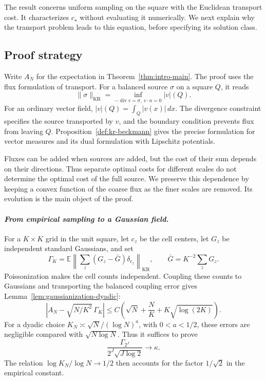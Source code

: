 \documentclass{aomart}
\theoremstyle{definition}
\newcommand{\1}{\mathbf 1}
\newcommand{\KR}{\mathrm{KR}}
\begin{document}
The result concerns uniform sampling on the square with the Euclidean
transport cost.  It characterizes $c_\star$ without evaluating it
numerically.  We next explain why the transport problem leads to this
equation, before specifying its solution class.

\subsection{Proof strategy}\label{subsec:proof-roadmap}

Write $A_N$ for the expectation in Theorem~\ref{thm:intro-main}.
The proof uses the flux formulation of transport.  For a balanced source
$\sigma$ on a square $Q$, it reads
\[
\|\sigma\|_{\KR}
=\inf_{-\operatorname{div}v=\sigma,\ v\cdot n=0}|v|(Q).
\]
For an ordinary vector field, $|v|(Q)=\int_Q|v(x)|\,dx$.
The divergence constraint specifies the source transported by $v$, and
the boundary condition prevents flux from leaving $Q$.
Proposition~\ref{def:kr-beckmann} gives the precise formulation for vector
measures and its dual formulation with Lipschitz potentials.

Fluxes can be added when sources are added, but the cost of their sum
depends on their directions.  Thus separate optimal costs for different
scales do not determine the optimal cost of the full source.  We preserve
this dependence by keeping a convex function of the coarse flux as the
finer scales are removed.  Its evolution is the main object of the proof.

\smallskip
\paragraph{\textit{From empirical sampling to a Gaussian field.}}
For a $K\times K$ grid in the unit square, let $c_z$ be the cell centers,
let $G_z$ be independent standard Gaussians, and set
\[
\Gamma_K=\mathbb E\left\|
\sum_z(G_z-\bar G)\delta_{c_z}\right\|_{\KR},
\qquad \bar G=K^{-2}\sum_zG_z.
\]
Poissonization makes the cell counts independent.  Coupling these counts
to Gaussians and transporting the balanced coupling error gives
Lemma~\ref{lem:gaussianization-dyadic}:
\[
\left|A_N-\sqrt{N/K^2}\,\Gamma_K\right|
\leq C\left(\sqrt N+\frac NK+K\sqrt{\log(2K)}\right).
\]
For a dyadic choice $K_N\asymp\sqrt N/(\log N)^a$, with $0<a<1/2$,
these errors are negligible compared with $\sqrt{N\log N}$.
Thus it suffices to prove
\begin{equation}
\frac{\Gamma_{2^J}}{2^J\sqrt{J\log2}}\longrightarrow\kappa.
\tag{R}\label{eq:roadmap-gaussian-target}
\end{equation}
The relation $\log K_N/\log N\to1/2$ then accounts for the factor
$1/\sqrt2$ in the empirical constant.
\end{document}
